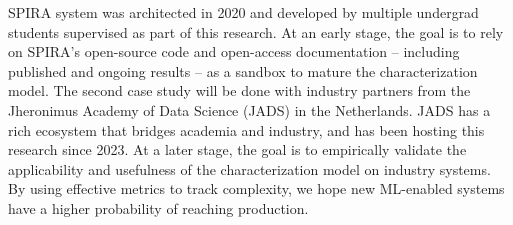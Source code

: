 {SPIRA system was architected in 2020 and developed by multiple undergrad
students supervised as part of this research. At an early stage, the goal is to
rely on SPIRA's open-source code and open-access documentation -- including
published and ongoing results -- as a sandbox to mature the characterization
model. The second case study will be done with industry partners from the
Jheronimus Academy of Data Science (JADS) in the Netherlands. JADS has a rich
ecosystem that bridges academia and industry, and has been hosting this research
since 2023. At a later stage, the goal is to empirically validate the
applicability and usefulness of the characterization model on industry systems.
By using effective metrics to track complexity, we hope new ML-enabled systems
have a higher probability of reaching production.
}

